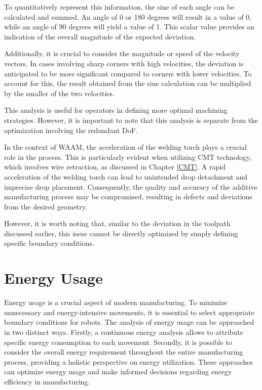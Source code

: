 To quantitatively represent this information, the sine of each angle can be calculated and summed. An angle of 0 or 180 degrees will result in a value of 0, while an angle of 90 degrees will yield a value of 1. This scalar value provides an indication of the overall magnitude of the expected deviation.

Additionally, it is crucial to consider the magnitude or speed of the velocity vectors. In cases involving sharp corners with high velocities, the deviation is anticipated to be more significant compared to corners with lower velocities. To account for this, the result obtained from the sine calculation can be multiplied by the smaller of the two velocities.

This analysis is useful for operators in defining more optimal machining strategies. However, it is important to note that this analysis is separate from the optimization involving the redundant DoF.

In the context of WAAM, the acceleration of the welding torch plays a crucial role in the process. This is particularly evident when utilizing CMT technology, which involves wire retraction, as discussed in Chapter \ref{CMT}. A rapid acceleration of the welding torch can lead to unintended drop detachment and imprecise drop placement. Consequently, the quality and accuracy of the additive manufacturing process may be compromised, resulting in defects and deviations from the desired geometry.

However, it is worth noting that, similar to the deviation in the toolpath discussed earlier, this issue cannot be directly optimized by simply defining specific boundary conditions.

\section{Energy Usage}
Energy usage is a crucial aspect of modern manufacturing. To minimize unnecessary and energy-intensive movements, it is essential to select appropriate boundary conditions for robots. The analysis of energy usage can be approached in two distinct ways. Firstly, a continuous energy analysis allows to attribute specific energy consumption to each movement. Secondly, it is possible to consider the overall energy requirement throughout the entire manufacturing process, providing a holistic perspective on energy utilization. These approaches can optimize energy usage and make informed decisions regarding energy efficiency in manufacturing. 

